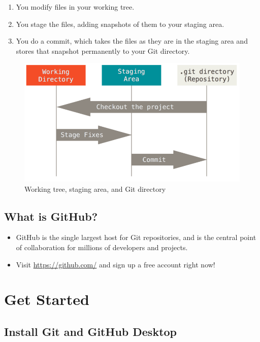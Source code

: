 \documentclass[a4paper,11pt]{article}
\begin{document}
\begin{enumerate}
\item You modify files in your working tree.
\item You stage the files, adding snapshots of them to your staging area.
\item You do a commit, which takes the files as they are in the staging
area and stores that snapshot permanently to your Git directory.
\end{enumerate}

\begin{figure}[htbp]
\centering
\includegraphics[width=.9\linewidth]{img/threestages.png}
\caption{\label{fig:org82a7936}
Working tree, staging area, and Git directory}
\end{figure}

\subsection{What is GitHub?}
\label{sec:org589da8b}

\begin{itemize}
\item GitHub is the single largest host for Git repositories, and is the
central point of collaboration for millions of developers and
projects.

\item Visit \url{https://github.com/} and sign up a free account right now!
\end{itemize}


\section{Get Started}
\label{sec:orga7edbb8}

\subsection{Install Git and GitHub Desktop}
\label{sec:orgc314b8f}
\end{document}
